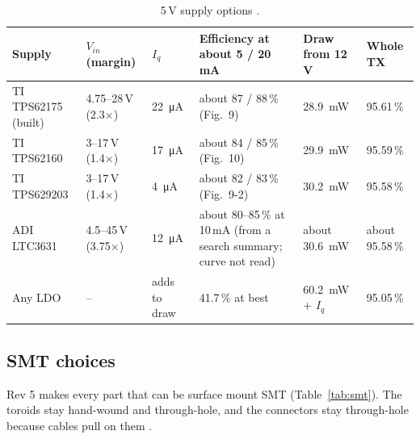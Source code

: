 \documentclass[11pt,letterpaper]{article}
\begin{document}
\begin{table}[h]
\centering\small
\caption{5\,V supply options \cite{tiTPS62175,tiTPS62160,tiTPS629203,adiLTC3631,projnotes}.}\label{tab:buck}
\begin{tabularx}{\textwidth}{@{}L{2.7cm}L{2.3cm}L{2.3cm}YL{1.8cm}L{1.5cm}@{}}
\toprule
Supply & $V_{in}$ (margin) & $I_q$ & Efficiency at about 5 / 20\,mA & Draw from 12\,V & Whole TX \\ \midrule
TI TPS62175 (built) & 4.75--28\,V (2.3$\times$) & \SI{22}{\micro\ampere} & about 87 / 88\,\% (Fig.~9) & \SI{28.9}{\milli\watt} & 95.61\,\% \\
TI TPS62160 & 3--17\,V (1.4$\times$) & \SI{17}{\micro\ampere} & about 84 / 85\,\% (Fig.~10) & \SI{29.9}{\milli\watt} & 95.59\,\% \\
TI TPS629203 & 3--17\,V (1.4$\times$) & \SI{4}{\micro\ampere} & about 82 / 83\,\% (Fig.~9-2) & \SI{30.2}{\milli\watt} & 95.58\,\% \\
ADI LTC3631 & 4.5--45\,V (3.75$\times$) & \SI{12}{\micro\ampere} & about 80--85\,\% at 10\,mA (from a search summary; curve not read) & about \SI{30.6}{\milli\watt} & about 95.58\,\% \\
Any LDO & -- & adds to draw & 41.7\,\% at best & \SI{60.2}{\milli\watt} + $I_q$ & 95.05\,\% \\
\bottomrule
\end{tabularx}
\end{table}

\subsection{SMT choices}\label{sec:smt}

Rev 5 makes every part that can be surface mount SMT (Table~\ref{tab:smt}). The toroids stay hand-wound and through-hole, and the connectors stay through-hole because cables pull on them \cite{projkicad,projnotes}.
\end{document}
